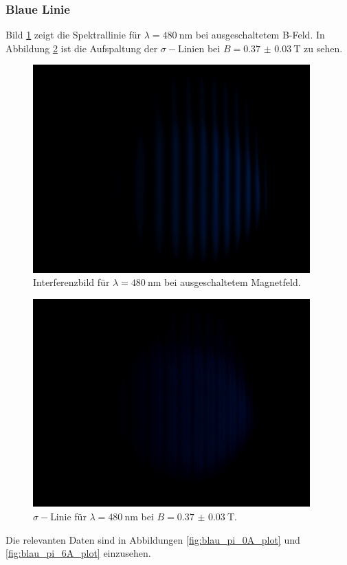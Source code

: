 \subsubsection{Blaue Linie}
Bild \ref{fig:blau_pi_0A} zeigt die Spektrallinie für $\lambda=\SI{480}{\nano\meter}$ bei ausgeschaltetem B-Feld.
In Abbildung \ref{fig:blau_pi_6A} ist die Aufspaltung der $\sigma-$Linien bei $B=\SI{0.37(3)}{\tesla}$ zu sehen.
\begin{figure}[htb]
  \centering
  \includegraphics[height=8cm]{content/pictures/blau_pi_0A.JPG}
  \caption{Interferenzbild für $\lambda=\SI{480}{\nano\meter}$ bei ausgeschaltetem Magnetfeld.}
  \label{fig:blau_pi_0A}
\end{figure}
\begin{figure}[htb]
  \centering
  \includegraphics[height=8cm]{content/pictures/blau_pi_6A.JPG}
  \caption{$\sigma-$Linie für $\lambda=\SI{480}{\nano\meter}$ bei $B=\SI{0.37(3)}{\tesla}$.}
  \label{fig:blau_pi_6A}
\end{figure}
Die relevanten Daten sind in Abbildungen \ref{fig:blau_pi_0A_plot} und \ref{fig:blau_pi_6A_plot} einzusehen.
